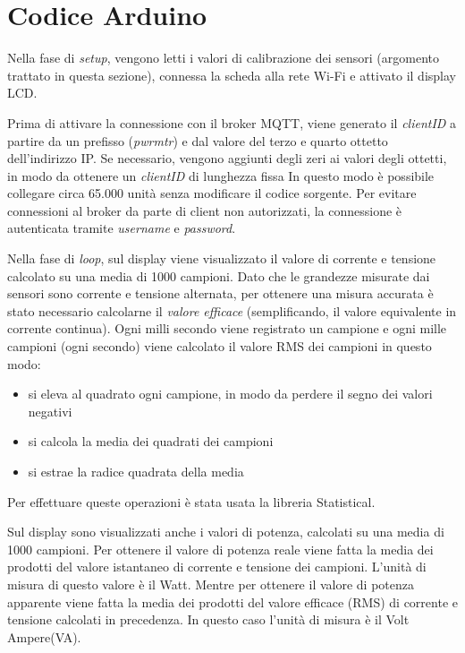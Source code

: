 \documentclass[italian,12pt,a4paper,oneside,final]{report}
\begin{document}
\newpage

\section{Codice Arduino}
Nella fase di \textit{setup}, vengono letti i valori di calibrazione dei sensori (argomento trattato in questa sezione), connessa la scheda alla rete Wi-Fi e attivato il display LCD.

Prima di attivare la connessione con il broker MQTT, viene generato il \textit{clientID} a partire da un prefisso (\emph{pwrmtr}) e dal valore del terzo e quarto ottetto dell'indirizzo IP.
Se necessario, vengono aggiunti degli zeri ai valori degli ottetti, in modo da ottenere un \textit{clientID} di lunghezza fissa 
In questo modo è possibile collegare circa 65.000 unità senza modificare il codice sorgente.
Per evitare connessioni al broker da parte di client non autorizzati, la connessione è autenticata tramite \textit{username} e \textit{password}.

Nella fase di \textit{loop}, sul display viene visualizzato il valore di corrente e tensione calcolato su una media di 1000 campioni.
Dato che le grandezze misurate dai sensori sono corrente e tensione alternata, per ottenere una misura accurata è stato necessario calcolarne il \emph{valore efficace} (semplificando, il valore equivalente in corrente continua).
Ogni milli secondo viene registrato un campione e ogni mille campioni (ogni secondo) viene calcolato il valore RMS dei campioni in questo modo:
\begin{itemize}
  \item si eleva al quadrato ogni campione, in modo da perdere il segno dei valori negativi
  \item si calcola la media dei quadrati dei campioni
  \item si estrae la radice quadrata della media
\end{itemize}

\noindent Per effettuare queste operazioni è stata usata la libreria Statistical.

Sul display sono visualizzati anche i valori di potenza, calcolati su una media di 1000 campioni.
Per ottenere il valore di potenza reale viene fatta la media dei prodotti del valore istantaneo di corrente e tensione dei campioni.
L'unità di misura di questo valore è il Watt.
Mentre per ottenere il valore di potenza apparente viene fatta la media dei prodotti del valore efficace (RMS) di corrente e tensione calcolati in precedenza.
In questo caso l'unità di misura è il Volt Ampere(VA).
\end{document}
